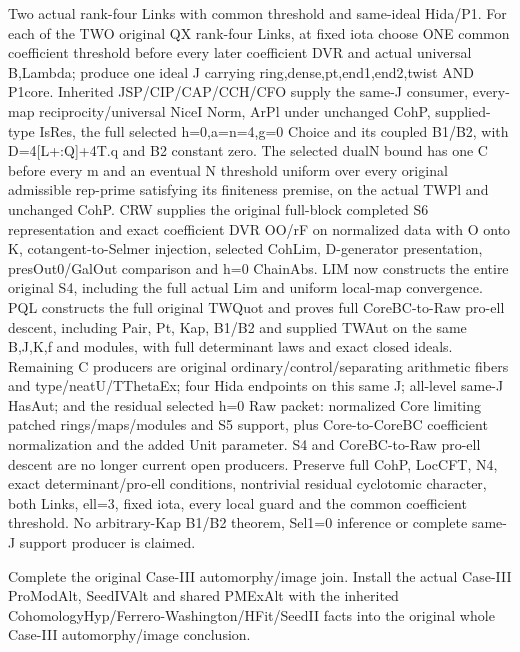 \begin{description}[style=nextline]
\item[13. COUNT\_II\_SUPPORT --- C] Two actual rank-four Links with common threshold and same-ideal Hida/\allowbreak{}P1. For each of the TWO original QX rank-four Links, at fixed iota choose ONE common coefficient threshold before every later coefficient DVR and actual universal B,Lambda; produce one ideal J carrying ring,dense,pt,end1,end2,twist AND P1core. Inherited JSP/\allowbreak{}CIP/\allowbreak{}CAP/\allowbreak{}CCH/\allowbreak{}CFO supply the same-J consumer, every-map reciprocity/\allowbreak{}universal NiceI Norm, ArPl under unchanged CohP, supplied-type IsRes, the full selected h=0,a=n=4,g=0 Choice and its coupled B1/\allowbreak{}B2, with D=4[L+:Q]+4T.q and B2 constant zero. The selected dualN bound has one C before every m and an eventual N threshold uniform over every original admissible rep-prime satisfying its finiteness premise, on the actual TWPl and unchanged CohP. CRW supplies the original full-block completed S6 representation and exact coefficient DVR OO/\allowbreak{}rF on normalized data with O onto K, cotangent-to-Selmer injection, selected CohLim, D-generator presentation, presOut0/\allowbreak{}GalOut comparison and h=0 ChainAbs. LIM now constructs the entire original S4, including the full actual Lim and uniform local-map convergence. PQL constructs the full original TWQuot and proves full CoreBC-to-Raw pro-ell descent, including Pair, Pt, Kap, B1/\allowbreak{}B2 and supplied TWAut on the same B,J,K,f and modules, with full determinant laws and exact closed ideals. Remaining C producers are original ordinary/\allowbreak{}control/\allowbreak{}separating arithmetic fibers and type/\allowbreak{}neatU/\allowbreak{}TThetaEx; four Hida endpoints on this same J; all-level same-J HasAut; and the residual selected h=0 Raw packet: normalized Core limiting patched rings/\allowbreak{}maps/\allowbreak{}modules and S5 support, plus Core-to-CoreBC coefficient normalization and the added Unit parameter. S4 and CoreBC-to-Raw pro-ell descent are no longer current open producers. Preserve full CohP, LocCFT, N4, exact determinant/\allowbreak{}pro-ell conditions, nontrivial residual cyclotomic character, both Links, ell=3, fixed iota, every local guard and the common coefficient threshold. No arbitrary-Kap B1/\allowbreak{}B2 theorem, Sel1=0 inference or complete same-J support producer is claimed.

\item[14. TASK\_CASE3\_AUT\_JOIN --- B] Complete the original Case-III automorphy/\allowbreak{}image join. Install the actual Case-III ProModAlt, SeedIVAlt and shared PMExAlt with the inherited CohomologyHyp/\allowbreak{}Ferrero-Washington/\allowbreak{}HFit/\allowbreak{}SeedII facts into the original whole Case-III automorphy/\allowbreak{}image conclusion.


\end{description}
